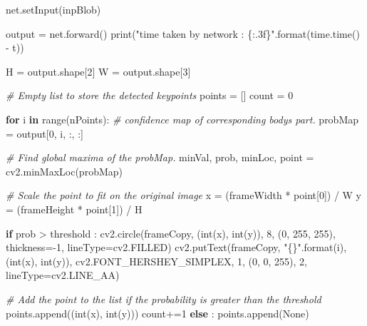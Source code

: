 \documentclass[
  12pt,
  a4paper,
]{article}
\newenvironment{Shaded}{}{}
\newcommand{\BuiltInTok}[1]{#1}
\newcommand{\CommentTok}[1]{\textcolor[rgb]{0.38,0.63,0.69}{\textit{#1}}}
\newcommand{\ControlFlowTok}[1]{\textcolor[rgb]{0.00,0.44,0.13}{\textbf{#1}}}
\newcommand{\DecValTok}[1]{\textcolor[rgb]{0.25,0.63,0.44}{#1}}
\newcommand{\KeywordTok}[1]{\textcolor[rgb]{0.00,0.44,0.13}{\textbf{#1}}}
\newcommand{\NormalTok}[1]{#1}
\newcommand{\OperatorTok}[1]{\textcolor[rgb]{0.40,0.40,0.40}{#1}}
\newcommand{\SpecialCharTok}[1]{\textcolor[rgb]{0.25,0.44,0.63}{#1}}
\newcommand{\StringTok}[1]{\textcolor[rgb]{0.25,0.44,0.63}{#1}}
\newcommand{\VariableTok}[1]{\textcolor[rgb]{0.10,0.09,0.49}{#1}}
\begin{document}
\begin{Shaded}
\begin{Highlighting}[numbers=left,,]
\NormalTok{net.setInput(inpBlob)}

\NormalTok{output }\OperatorTok{=}\NormalTok{ net.forward()}
\BuiltInTok{print}\NormalTok{(}\StringTok{"time taken by network : }\SpecialCharTok{\{:.3f\}}\StringTok{"}\NormalTok{.}\BuiltInTok{format}\NormalTok{(time.time() }\OperatorTok{{-}}\NormalTok{ t))}

\NormalTok{H }\OperatorTok{=}\NormalTok{ output.shape[}\DecValTok{2}\NormalTok{]}
\NormalTok{W }\OperatorTok{=}\NormalTok{ output.shape[}\DecValTok{3}\NormalTok{]}

\CommentTok{\# Empty list to store the detected keypoints}
\NormalTok{points }\OperatorTok{=}\NormalTok{ []}
\NormalTok{count }\OperatorTok{=} \DecValTok{0}

\ControlFlowTok{for}\NormalTok{ i }\KeywordTok{in} \BuiltInTok{range}\NormalTok{(nPoints):}
    \CommentTok{\# confidence map of corresponding body\textquotesingle{}s part.}
\NormalTok{    probMap }\OperatorTok{=}\NormalTok{ output[}\DecValTok{0}\NormalTok{, i, :, :]}

    \CommentTok{\# Find global maxima of the probMap.}
\NormalTok{    minVal, prob, minLoc, point }\OperatorTok{=}\NormalTok{ cv2.minMaxLoc(probMap)}
    
    \CommentTok{\# Scale the point to fit on the original image}
\NormalTok{    x }\OperatorTok{=}\NormalTok{ (frameWidth }\OperatorTok{*}\NormalTok{ point[}\DecValTok{0}\NormalTok{]) }\OperatorTok{/}\NormalTok{ W}
\NormalTok{    y }\OperatorTok{=}\NormalTok{ (frameHeight }\OperatorTok{*}\NormalTok{ point[}\DecValTok{1}\NormalTok{]) }\OperatorTok{/}\NormalTok{ H}

    \ControlFlowTok{if}\NormalTok{ prob }\OperatorTok{\textgreater{}}\NormalTok{ threshold : }
\NormalTok{        cv2.circle(frameCopy, (}\BuiltInTok{int}\NormalTok{(x), }\BuiltInTok{int}\NormalTok{(y)), }\DecValTok{8}\NormalTok{, (}\DecValTok{0}\NormalTok{, }\DecValTok{255}\NormalTok{, }\DecValTok{255}\NormalTok{), thickness}\OperatorTok{={-}}\DecValTok{1}\NormalTok{, lineType}\OperatorTok{=}\NormalTok{cv2.FILLED)}
\NormalTok{        cv2.putText(frameCopy, }\StringTok{"}\SpecialCharTok{\{\}}\StringTok{"}\NormalTok{.}\BuiltInTok{format}\NormalTok{(i), (}\BuiltInTok{int}\NormalTok{(x), }\BuiltInTok{int}\NormalTok{(y)), cv2.FONT\_HERSHEY\_SIMPLEX, }\DecValTok{1}\NormalTok{, (}\DecValTok{0}\NormalTok{, }\DecValTok{0}\NormalTok{, }\DecValTok{255}\NormalTok{), }\DecValTok{2}\NormalTok{, lineType}\OperatorTok{=}\NormalTok{cv2.LINE\_AA)}

        \CommentTok{\# Add the point to the list if the probability is greater than the threshold}
\NormalTok{        points.append((}\BuiltInTok{int}\NormalTok{(x), }\BuiltInTok{int}\NormalTok{(y)))}
\NormalTok{        count}\OperatorTok{+=}\DecValTok{1}
    \ControlFlowTok{else}\NormalTok{ :}
\NormalTok{        points.append(}\VariableTok{None}\NormalTok{)}


\end{Highlighting}
\end{Shaded}
\end{document}
